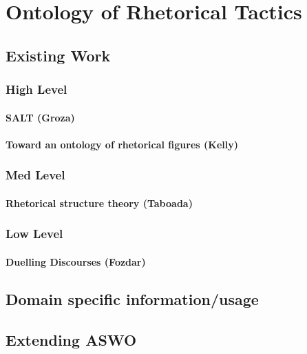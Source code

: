 \chapter{Ontology of Rhetorical Tactics}

\section{Existing Work}

\subsection{High Level}

\subsubsection{SALT (Groza)}

\subsubsection{Toward an ontology of rhetorical figures (Kelly)}

\subsection{Med Level}

\subsubsection{Rhetorical structure theory (Taboada)}

\subsection{Low Level}

\subsubsection{Duelling Discourses (Fozdar)}

\section{Domain specific information/usage}

\section{Extending ASWO}